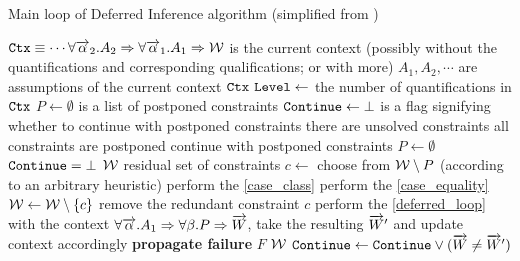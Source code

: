 \begin{algorithm}
    \caption{Main loop of Deferred Inference algorithm (simplified from \cite{peytonjones2019type})}
    \label{deferred_loop}
    \begin{algorithmic}
        \Require $\mathtt{Ctx} \equiv \cdots \forall \overrightarrow{\alpha}_2 . A_2 \Rightarrow \forall \overrightarrow{\alpha}_1 . A_1 \Rightarrow \mathcal W$ is the current context (possibly without the quantifications and corresponding qualifications; or with more)
        \State \Comment $A_1, A_2, \cdots$ are assumptions of the current context $\mathtt{Ctx}$
        \State $\mathtt{Level} \gets$ the number of quantifications in $\mathtt{Ctx}$
        \State $P \gets \emptyset$ is a list of postponed constraints
        \State $\mathtt{Continue} \gets \bot$ is a flag signifying whether to continue with postponed constraints
         \Comment there are unsolved constraints
             \Comment all constraints are postponed
                 \Comment continue with postponed constraints
                    \State $P \gets \emptyset$
                    \State $\mathtt{Continue} = \bot$
                \Else
                    \State \Return $\mathcal W$ \Comment residual set of constraints
                \EndIf
            \EndIf
            \State $c \gets $ choose from $\mathcal W \setminus P$ (according to an arbitrary heuristic)
                \State perform the \cref{case_class}
                \State perform the \cref{case_equality}
                    \State $\mathcal W \gets \mathcal W \setminus \{c\}$ \Comment remove the redundant constraint $c$
                \Else
                    \State perform the \cref{deferred_loop} with the context $\forall \overrightarrow{\alpha} . A_1 \Rightarrow \forall \beta . P \Rightarrow \overrightarrow{W}$, take the resulting $\overrightarrow{W}'$ and update context accordingly
                        \State \textbf{propagate failure} $F$
                        \State \Return $\mathcal W$
                    \EndIf
                    \State $\mathtt{Continue} \gets \mathtt{Continue} \lor (\overrightarrow{W} \neq \overrightarrow{W}')$
                \EndIf
            \EndIf
        \EndWhile
    \end{algorithmic}
\end{algorithm}
